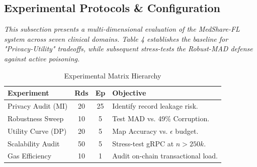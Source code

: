\documentclass[10pt, a4paper, twocolumn]{article}
\begin{document}
\subsection{Experimental Protocols \& Configuration}

\textit{This subsection presents a multi-dimensional evaluation of the MedShare-FL system across seven clinical domains. Table 4 establishes the baseline for "Privacy-Utility" tradeoffs, while subsequent stress-tests the Robust-MAD defense against active poisoning.}

\begin{table}[hbt!]
\centering
\scriptsize
\begin{tabular}{lccl}
\toprule
\textbf{Experiment} & \textbf{Rds} & \textbf{Ep} & \textbf{Objective} \\
\midrule
Privacy Audit (MI) & 20 & 25 & Identify record leakage risk. \\
Robustness Sweep & 10 & 5 & Test MAD vs. 49\% Corruption. \\
Utility Curve (DP) & 20 & 5 & Map Accuracy vs. $\epsilon$ budget. \\
Scalability Audit & 50 & 5 & Stress-test gRPC at $n > 250k$. \\
Gas Efficiency & 10 & 1 & Audit on-chain transactional load. \\
\bottomrule
\end{tabular}
\caption{Experimental Matrix Hierarchy}
\end{table}
\end{document}
